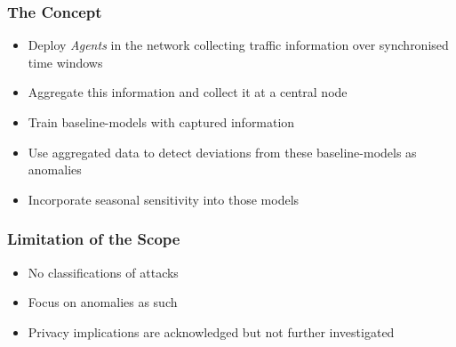 \begin{frame}[c]
	\frametitle{The Concept}
	
	\begin{itemize}
		\item<1> Deploy \emph{Agents} in the network collecting traffic information over synchronised time windows
		\item<1-2> Aggregate this information and collect it at a central node
		\item<1-2> Train baseline-models with captured information
		\item<1-2> Use aggregated data to detect deviations from these baseline-models as anomalies
		\item<1-2> Incorporate seasonal sensitivity into those models
			
	\end{itemize}

	\nocite{Jung2018}
\end{frame}

\begin{frame}[c]
	\frametitle{Limitation of the Scope}
	
	\begin{itemize}
		\item No classifications of attacks
		\item Focus on anomalies as such
		\item Privacy implications are acknowledged but not further investigated
	\end{itemize}
	
\end{frame}

